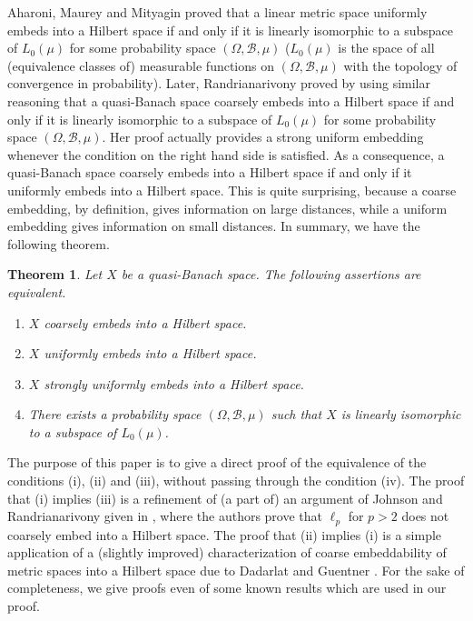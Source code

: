\documentclass[a4paper,oneside]{amsart}
\newtheorem{thm}{Theorem}[section]
\theoremstyle{definition}
\begin{document}
Aharoni, Maurey and Mityagin \cite[Theorem~4.1]{amm} proved that a linear metric space uniformly embeds into a Hilbert space if and only if it is linearly isomorphic to a subspace of $L_0(\mu)$ for some probability space $(\Omega,\mathcal{B},\mu)$ ($L_0(\mu)$ is the space of all (equivalence classes of) measurable functions on $(\Omega,\mathcal{B},\mu)$ with the topology of convergence in probability). Later, Randrianarivony \cite[Theorem~1]{ra} proved by using similar reasoning that a quasi-Banach space coarsely embeds into a Hilbert space if and only if it is linearly isomorphic to a subspace of $L_0(\mu)$ for some probability space $(\Omega,\mathcal{B},\mu)$. Her proof actually provides a strong uniform embedding whenever the condition on the right hand side is satisfied. As a consequence, a quasi-Banach space coarsely embeds into a Hilbert space if and only if it uniformly embeds into a Hilbert space. This is quite surprising, because a coarse embedding, by definition, gives information on large distances, while a uniform embedding gives information on small distances. In summary, we have the following theorem.

\begin{thm}\label{main_thm}
Let $X$ be a quasi-Banach space. The following assertions are equivalent.

\begin{enumerate}
\item $X$ coarsely embeds into a Hilbert space.
\item $X$ uniformly embeds into a Hilbert space.
\item $X$ strongly uniformly embeds into a Hilbert space.
\item There exists a probability space $(\Omega,\mathcal{B},\mu)$ such that $X$ is linearly isomorphic to a subspace of $L_0(\mu)$.
\end{enumerate}
\end{thm}

The purpose of this paper is to give a direct proof of the equivalence of the conditions (i), (ii) and (iii), without passing through the condition (iv). The proof that (i) implies (iii) is a refinement of (a part of) an argument of Johnson and Randrianarivony given in \cite{jr}, where the authors prove that $\ell_p$ for $p>2$ does not coarsely embed into a Hilbert space. The proof that (ii) implies (i) is a simple application of a (slightly improved) characterization of coarse embeddability of metric spaces into a Hilbert space due to Dadarlat and Guentner \cite[Proposition~2.1]{dg}. For the sake of completeness, we give proofs even of some known results which are used in our proof.
\end{document}
